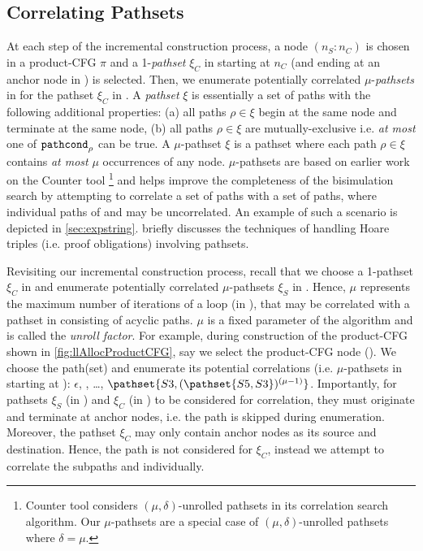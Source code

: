 \subsection{Correlating Pathsets}
\label{sec:pathsetcorrel}
At each step of the incremental construction process, a node $(n_S\!:\!n_C)$ is chosen in a product-CFG $\pi$
and a 1-{\em pathset} $\xi_C$ in \cprog{} starting at $n_C$ (and ending at an anchor node in \cprog{}) is selected.
Then, we enumerate potentially correlated $\mu$-{\em pathsets} in \sprog{} for the pathset $\xi_C$ in \cprog{}.
A {\em pathset} $\xi$ is essentially a set of paths with the following additional properties:
(a) all paths $\rho \in \xi$ begin at the same node and terminate at the same node,
(b) all paths $\rho \in \xi$ are mutually-exclusive i.e. {\em at most} one of ${\tt pathcond}_\rho$ can be true.
A $\mu$-pathset $\xi$ is a pathset where each path $\rho \in \xi$ contains {\em at most} $\mu$ occurrences of any node.
$\mu$-pathsets are based on earlier work on the Counter tool \cite{oopsla20}\footnote{
Counter tool \cite{oopsla20} considers $(\mu,\delta)$-unrolled pathsets in its correlation search algorithm.
Our $\mu$-pathsets are a special case of $(\mu,\delta)$-unrolled pathsets where $\delta = \mu$.}
and helps improve the completeness of the bisimulation search
by attempting to correlate a set of \cprog{} paths with a set of \sprog{} paths,
where individual paths of \cprog{} and \sprog{} may be uncorrelated.
An example of such a scenario is depicted in \cref{sec:expstring}.
 briefly discusses the techniques of handling Hoare triples (i.e. proof obligations)
involving pathsets.

Revisiting our incremental construction process, recall that we choose a 1-pathset $\xi_C$ in \cprog{}
and enumerate potentially correlated $\mu$-pathsets $\xi_S$ in \sprog{}.
Hence, $\mu$ represents the maximum number of iterations of a loop (in \sprog{}),
that may be correlated with a pathset in \cprog{} consisting of acyclic paths.
$\mu$ is a fixed parameter of the \toolName{} algorithm and is called the {\em unroll factor}.
For example, during construction of the product-CFG shown in \cref{fig:llAllocProductCFG},
say we select the product-CFG node ().
We choose the \cprog{} path(set)  and enumerate its potential correlations (i.e. $\mu$-pathsets in \sprog{} starting at ):
$\epsilon$, , \ldots, $\pathset{S3,(\pathset{S5,S3})^{(\mu-1)}}$.
Importantly, for pathsets $\xi_S$ (in \sprog{}) and $\xi_C$ (in \cprog{}) to be considered for correlation,
they must originate and terminate at anchor nodes, i.e. the path  is skipped during enumeration.
Moreover, the pathset $\xi_C$ may only contain anchor nodes as its source and destination.
Hence, the path  is not considered for $\xi_C$,
instead we attempt to correlate the subpaths  and  individually.

